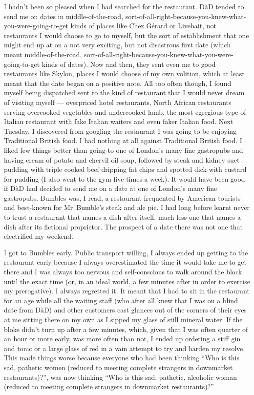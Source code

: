 I hadn't been so pleased when I had searched for the restaurant.
DàD tended to send me on dates in
middle-of-the-road, sort-of-all-right-because-you-knew-what-you-were-going-to-get kinds of places like Chez
Gérard or Livebait, not restaurants I would choose to go to myself, but the sort of establishment that one might end up at on a not very exciting, but not disastrous first date (which meant middle-of-the-road, sort-of-all-right-because-you-knew-what-you-were-going-to-get kinds of dates).
Now and then, they sent even me to good restaurants like Skylon, places I would choose of my own volition, which at least meant that the date began on a positive note. All too often though, I found
myself being dispatched sent to the kind of restaurant that I would
never dream of visiting myself --- overpriced hotel restaurants, North African restaurants serving overcooked vegetables and undercooked lamb, the most egregious type
of Italian restaurant with fake Italian waiters and even faker
Italian food. Next Tuesday, I discovered from googling the restaurant I was going to be enjoying Traditional British
food. I had nothing at all against Traditional British food. I liked few
things better than going to one of London's many fine
gastropubs and having cream of potato and chervil oil soup, followed
by steak and kidney suet pudding with triple cooked beef dripping fat chips and spotted dick
with custard for pudding (I also went to the gym five times a week). It would have been good if DàD
had decided to send me on a date at one of London's many fine gastropubs. Bumbles was, I read, a restaurant frequented by American tourists and
best-known for Mr~Bumble's steak and ale {\twelveit pie}. I had long before learnt never to
trust a restaurant that names a dish after itself, much less one that names a dish after its fictional proprietor. The prospect of a date there was not one that electrified my weekend.

I got to Bumbles early. Public transport willing, I always ended up getting to the restaurant early
because I always overestimated the time it would take me to get there and I was always too nervous and self-conscious to walk around the block
until the exact time (or, in an ideal world, a few minutes after in order to exercise my prerogative). I always regretted it. It meant that I had to
sit in the restaurant for an age while all the waiting staff (who
after all knew that I was on a blind date from DàD)
and other customers cast glances out of the corners of their
eyes at me sitting there on my own as I sipped my glass of still mineral
water. If the bloke didn't turn up after a few minutes, which, given
that I was often quarter of an hour or more early, was more often than
not, I ended up ordering a stiff gin and tonic or a large glass of
red in a vain attempt to try and harden my resolve. This made things
worse because everyone who had been thinking ``Who is this sad,
pathetic women (reduced to meeting complete strangers in downmarket
restaurants)?'', was now thinking ``Who is this sad, pathetic,
{\twelveit alcoholic\/} woman (reduced to meeting complete strangers in downmarket restaurants)?''


